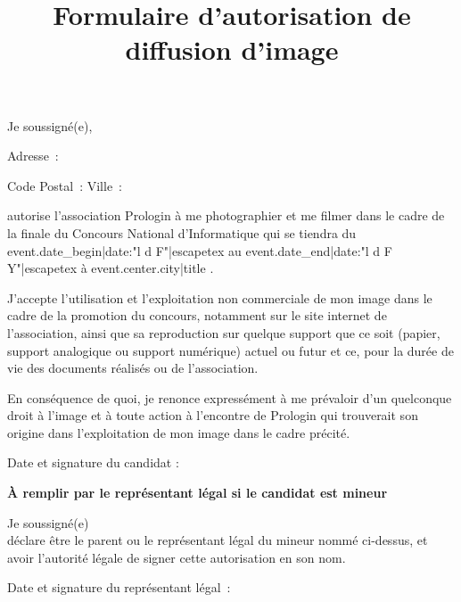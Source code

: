 \documentclass[a4paper,11pt]{prologin}
\title{Formulaire d'autorisation de diffusion d'image}
\begin{document}
Je soussigné(e), \dotfill

Adresse~: \dotfill

Code Postal~: \dotfill  Ville~: \dotfill

autorise l'association Prologin à me photographier et me filmer dans
le cadre de la finale du Concours National d'Informatique qui se tiendra du
{{ event.date_begin|date:"l d F"|escapetex }} au
{{ event.date_end|date:"l d F Y"|escapetex }} à {{ event.center.city|title }}.

J'accepte l'utilisation et l'exploitation non commerciale de mon
image dans le cadre de la promotion du concours, notamment sur le site internet
de l'association, ainsi que sa reproduction sur quelque support que ce soit
(papier, support analogique ou support numérique) actuel ou futur et ce, pour la
durée de vie des documents réalisés ou de l'association.

En conséquence de quoi, je renonce expressément à me prévaloir d'un
quelconque droit à l'image et à toute action à l'encontre de Prologin qui
trouverait son origine dans l'exploitation de mon image dans le cadre précité.

Date et signature du candidat :\vspace\baselineskip

\textbf{À remplir par le représentant légal si le candidat est mineur}

Je soussigné(e) \dotfill\\
déclare être le parent ou le représentant légal du mineur nommé
ci-dessus, et avoir l'autorité légale de signer cette autorisation en son nom.

Date et signature du représentant légal~:
\end{document}
